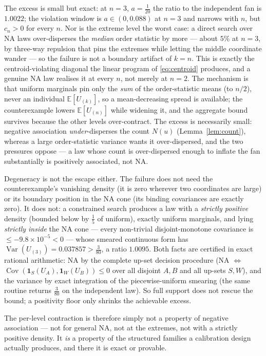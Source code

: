 \documentclass[11pt]{article}
\begin{document}
The excess is small but exact: at $n=3$, $a=\tfrac1{20}$ the ratio to the independent fan is $1.0022$;
the violation window is $a\in(0,0.088)$ at $n=3$ and narrows with $n$, but $c_n>0$ for every $n$. Nor is
the extreme level the worst case: a direct search over NA laws over-disperses the \emph{median} order
statistic by more --- about $5\%$ at $n=3$, by three-way repulsion that pins the extremes while letting
the middle coordinate wander --- so the failure is not a boundary artifact of $k=n$. This
is exactly the centroid-violating diagonal the linear program of \eqref{eq:centroid} produces, and a
genuine NA law realises it at every $n$, not merely at $n=2$. The
mechanism is that uniform marginals pin only the \emph{sum} of the order-statistic means (to $n/2$),
never an individual $\mathbb E[U_{(k)}]$, so a mean-decreasing spread is available; the counterexample
lowers $\mathbb E[U_{(n)}]$ while widening it, and the aggregate bound survives because the other levels
over-contract. The excess is necessarily small: negative association \emph{under}-disperses the count
$N(u)$ (Lemma~\ref{lem:count}), whereas a large order-statistic variance wants it over-dispersed, and
the two pressures oppose --- a law whose count is over-dispersed enough to inflate the fan substantially
is positively associated, not NA.

Degeneracy is not the escape either. The failure does not need the counterexample's vanishing
density (it is zero wherever two coordinates are large) or its boundary position in the NA cone (its
binding covariances are exactly zero). It does not: a constrained search produces a law with a
\emph{strictly positive} density (bounded below by $\tfrac15$ of uniform), exactly uniform marginals, and
lying \emph{strictly inside} the NA cone --- every non-trivial disjoint-monotone covariance is
$\le -9.8\times10^{-5}<0$ --- whose smeared continuous form has
$\operatorname{Var}(U_{(3)})=0.037857>\tfrac3{80}$, a ratio $1.0095$. Both facts are certified in exact
rational arithmetic: NA by the complete up-set decision procedure (NA $\iff$
$\operatorname{Cov}(\mathbf 1_S(U_A),\mathbf 1_W(U_B))\le0$ over all disjoint $A,B$ and all up-sets
$S,W$), and the variance by exact integration of the piecewise-uniform smearing (the same routine returns
$\tfrac3{80}$ on the independent law). So full support does not rescue the bound; a positivity floor only
shrinks the achievable excess.

The per-level contraction is therefore simply not a property of negative association --- not for general
NA, not at the extremes, not with a strictly positive density. It \emph{is} a property of the structured
families a calibration design actually produces, and there it is exact or provable.
\end{document}
